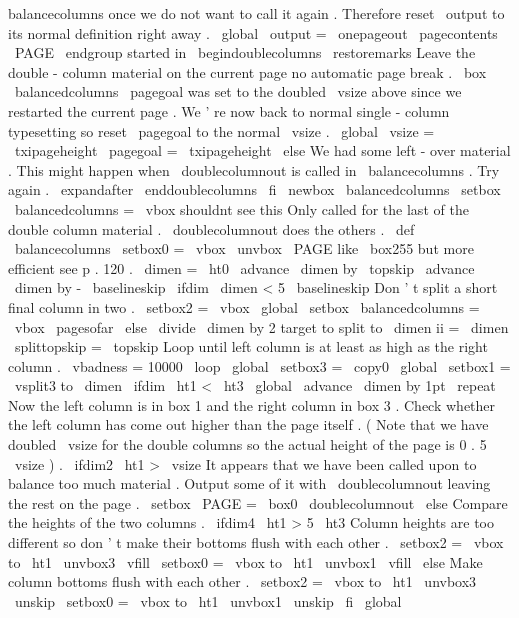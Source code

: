 {{{{balancecolumns
once
we
do
not
%
want
to
call
it
again
.
Therefore
reset
\
output
to
its
normal
%
definition
right
away
.
\
global
\
output
=
{
\
onepageout
{
\
pagecontents
\
PAGE
}
}
%
%
\
endgroup
%
started
in
\
begindoublecolumns
\
restoremarks
%
Leave
the
double
-
column
material
on
the
current
page
no
automatic
%
page
break
.
\
box
\
balancedcolumns
%
%
\
pagegoal
was
set
to
the
doubled
\
vsize
above
since
we
restarted
%
the
current
page
.
We
'
re
now
back
to
normal
single
-
column
%
typesetting
so
reset
\
pagegoal
to
the
normal
\
vsize
.
\
global
\
vsize
=
\
txipageheight
%
\
pagegoal
=
\
txipageheight
%
\
else
%
We
had
some
left
-
over
material
.
This
might
happen
when
\
doublecolumnout
%
is
called
in
\
balancecolumns
.
Try
again
.
\
expandafter
\
enddoublecolumns
\
fi
}
\
newbox
\
balancedcolumns
\
setbox
\
balancedcolumns
=
\
vbox
{
shouldnt
see
this
}
%
%
%
Only
called
for
the
last
of
the
double
column
material
.
\
doublecolumnout
%
does
the
others
.
\
def
\
balancecolumns
{
%
\
setbox0
=
\
vbox
{
\
unvbox
\
PAGE
}
%
like
\
box255
but
more
efficient
see
p
.
120
.
\
dimen
=
\
ht0
\
advance
\
dimen
by
\
topskip
\
advance
\
dimen
by
-
\
baselineskip
\
ifdim
\
dimen
<
5
\
baselineskip
%
Don
'
t
split
a
short
final
column
in
two
.
\
setbox2
=
\
vbox
{
}
%
\
global
\
setbox
\
balancedcolumns
=
\
vbox
{
\
pagesofar
}
%
\
else
\
divide
\
dimen
by
2
%
target
to
split
to
\
dimen
ii
=
\
dimen
\
splittopskip
=
\
topskip
%
Loop
until
left
column
is
at
least
as
high
as
the
right
column
.
{
%
\
vbadness
=
10000
\
loop
\
global
\
setbox3
=
\
copy0
\
global
\
setbox1
=
\
vsplit3
to
\
dimen
\
ifdim
\
ht1
<
\
ht3
\
global
\
advance
\
dimen
by
1pt
\
repeat
}
%
%
Now
the
left
column
is
in
box
1
and
the
right
column
in
box
3
.
%
%
Check
whether
the
left
column
has
come
out
higher
than
the
page
itself
.
%
(
Note
that
we
have
doubled
\
vsize
for
the
double
columns
so
%
the
actual
height
of
the
page
is
0
.
5
\
vsize
)
.
\
ifdim2
\
ht1
>
\
vsize
%
It
appears
that
we
have
been
called
upon
to
balance
too
much
material
.
%
Output
some
of
it
with
\
doublecolumnout
leaving
the
rest
on
the
page
.
\
setbox
\
PAGE
=
\
box0
\
doublecolumnout
\
else
%
Compare
the
heights
of
the
two
columns
.
\
ifdim4
\
ht1
>
5
\
ht3
%
Column
heights
are
too
different
so
don
'
t
make
their
bottoms
%
flush
with
each
other
.
\
setbox2
=
\
vbox
to
\
ht1
{
\
unvbox3
\
vfill
}
%
\
setbox0
=
\
vbox
to
\
ht1
{
\
unvbox1
\
vfill
}
%
\
else
%
Make
column
bottoms
flush
with
each
other
.
\
setbox2
=
\
vbox
to
\
ht1
{
\
unvbox3
\
unskip
}
%
\
setbox0
=
\
vbox
to
\
ht1
{
\
unvbox1
\
unskip
}
%
\
fi
\
global
\
}}}}
